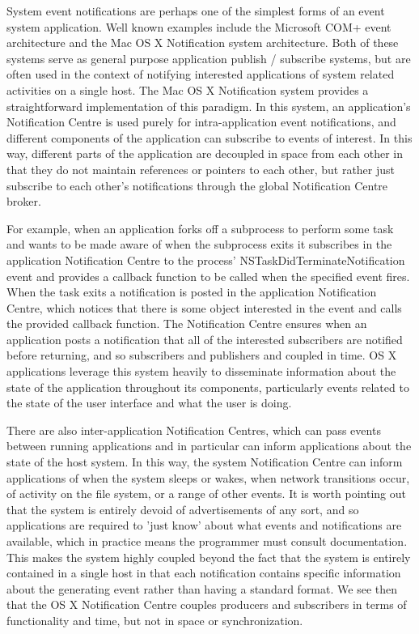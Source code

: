 \documentclass{acm_proc_article-sp}
\begin{document}
System event notifications are perhaps one of the simplest forms of an event system application. Well known examples include the Microsoft COM+ event architecture and the Mac OS X Notification system architecture. Both of these systems serve as general purpose application publish / subscribe systems, but are often used in the context of notifying interested applications of system related activities on a single host. The Mac OS X Notification system \cite{nsnotification} provides a straightforward implementation of this paradigm. In this system, an application's Notification Centre is used purely for intra-application event notifications, and different components of the application can subscribe to events of interest. In this way, different parts of the application are decoupled in space from each other in that they do not maintain references or pointers to each other, but rather just subscribe to each other's notifications through the global Notification Centre broker. 

For example, when an application forks off a subprocess to perform some task and wants to be made aware of when the subprocess exits it subscribes in the application Notification Centre to the process' NSTaskDidTerminateNotification event and provides a callback function to be called when the specified event fires. When the task exits a notification is posted in the application Notification Centre, which notices that there is some object interested in the event and calls the provided callback function. The Notification Centre ensures when an application posts a notification that all of the interested subscribers are notified before returning, and so subscribers and publishers and coupled in time. OS X applications leverage this system heavily to disseminate information about the state of the application throughout its components, particularly events related to the state of the user interface and what the user is doing. 

There are also inter-application Notification Centres, which can pass events between running applications and in particular can inform applications about the state of the host system. In this way, the system Notification Centre can inform applications of when the system sleeps or wakes, when network transitions occur, of activity on the file system, or a range of other events. It is worth pointing out that the system is entirely devoid of advertisements of any sort, and so applications are required to 'just know' about what events and notifications are available, which in practice means the programmer must consult documentation. This makes the system highly coupled beyond the fact that the system is entirely contained in a single host in that each notification contains specific information about the generating event rather than having a standard format. We see then that the OS X Notification Centre couples producers and subscribers in terms of functionality and time, but not in space or synchronization. 
\end{document}
